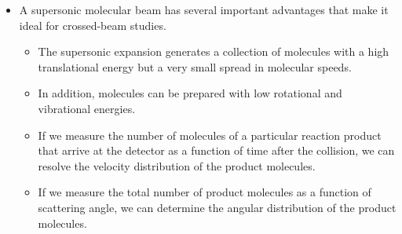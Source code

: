 \documentclass[../notes.tex]{subfiles}
\begin{document}
\begin{itemize}
\begin{figure}[h!]
\begin{subfigure}[b]{0.45\linewidth}
            \caption{Supersonic molecular beam source.}
            \label{fig:crossedMolBeamb}
        \end{subfigure}
        \caption{Crossed molecular beam machines.}
        \label{fig:crossedMolBeam}
    \end{figure}
    \begin{itemize}
        \item Figure \ref{fig:crossedMolBeama} depicts the overall setup in a crossed molecular beam machine. Each reactant is introduced into the vacuum chamber by a molecular beam source. The two molecular beams collide at the collision region.
        \item Figure \ref{fig:crossedMolBeamb} depicts a supersonic molecular beam source. The reactant is expanded along with an inert gas through a small orifice into the vacuum chamber. A skimmer is used so that a collimated beam of molecules is directed toward the collision region.
        \item The product molecules are detected using a mass spectrometer.
    \end{itemize}
    \item A supersonic molecular beam has several important advantages that make it ideal for crossed-beam studies.
    \begin{itemize}
        \item The supersonic expansion generates a collection of molecules with a high translational energy but a very small spread in molecular speeds.
        \item In addition, molecules can be prepared with low rotational and vibrational energies.
        \item If we measure the number of molecules of a particular reaction product that arrive at the detector as a function of time after the collision, we can resolve the velocity distribution of the product molecules.
        \item If we measure the total number of product molecules as a function of scattering angle, we can determine the angular distribution of the product molecules.

\end{itemize}
\end{itemize}
\end{document}
